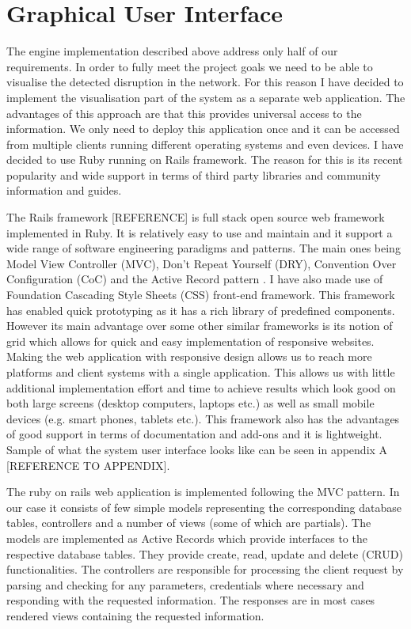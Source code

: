 \FloatBarrier
\section{Graphical User Interface}
The engine implementation described above address only half of our requirements. In order to fully meet the project goals we need to be able to visualise the detected disruption in the network. For this reason I have decided to implement the visualisation part of the system as a separate web application. The advantages of this approach are that this provides universal access to the information. We only need to deploy this application once and it can be accessed from multiple clients running different operating systems and even devices. I have decided to use Ruby running on Rails framework. The reason for this is its recent popularity and wide support in terms of third party libraries and community information and guides.

The Rails framework [REFERENCE] is full stack open source web framework implemented in Ruby. It is relatively easy to use and maintain and it support a wide range of software engineering paradigms and patterns. The main ones being Model View Controller (MVC), Don't Repeat Yourself (DRY), Convention Over Configuration (CoC) and the Active Record pattern \cite{fowler2003patterns}. I have also made use of Foundation Cascading Style Sheets (CSS) front-end framework. This framework has enabled quick prototyping as it has a rich library of predefined components. However its main advantage over some other similar frameworks is its notion of grid which allows for quick and easy implementation of responsive websites. Making the web application with responsive design allows us to reach more platforms and client systems with a single application. This allows us with little additional implementation effort and time to achieve results which look good on both large screens (desktop computers, laptops etc.) as well as small mobile devices (e.g. smart phones, tablets etc.). This framework also has the advantages of good support in terms of documentation and add-ons and it is lightweight. Sample of what the system user interface looks like can be seen in appendix A [REFERENCE TO APPENDIX].

The ruby on rails web application is implemented following the MVC pattern. In our case it consists of few simple models representing the corresponding database tables, controllers and a number of views (some of which are partials). The models are implemented as Active Records which provide interfaces to the respective database tables. They provide create, read, update and delete (CRUD) functionalities. The controllers are responsible for processing the client request by parsing and checking for any parameters, credentials where necessary and responding with the requested information. The responses are in most cases rendered views containing the requested information.

